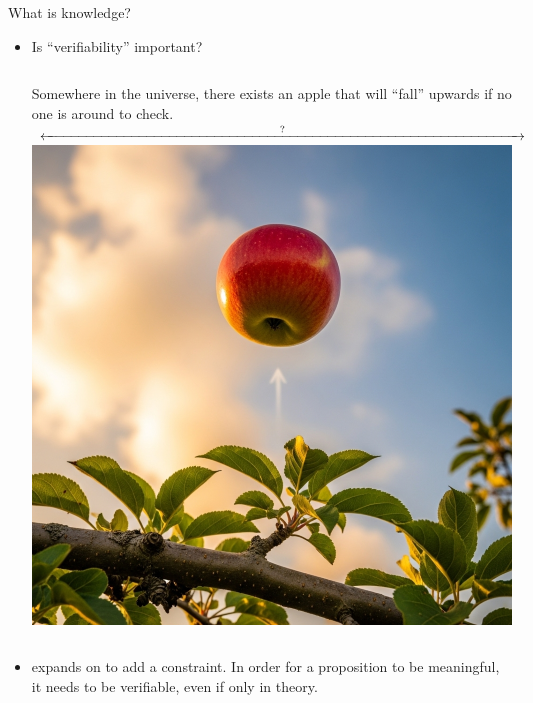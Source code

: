 \begin{frame}{What is knowledge?}
    \begin{itemize}
        \item
              Is ``verifiability'' important?
              \vspace{1em}
              \begin{center}
                  \begin{minipage}{0.7\textwidth}
                      \begin{columns}[c]
                          Somewhere in the universe, there exists an apple that will ``fall'' upwards if no one is around to check.
                          \centering
                          $\xleftrightarrow{\hspace*{0.5\linewidth}?\hspace*{0.5\linewidth}}$
                          \centering
                          \includegraphics[width=\linewidth]{images/apple-rising.png}
                      \end{columns}
                  \end{minipage}
              \end{center}
        \item {} expands on  to add a  constraint. In order for a proposition to be meaningful,
              it needs to be verifiable, even if only in theory.
    \end{itemize}
\end{frame}